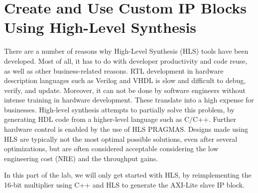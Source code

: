 \documentclass[a4paper,12pt,twoside]{article}
\begin{document}
\section{Create and Use Custom IP Blocks Using High-Level Synthesis}\label{S2}
There are a number of reasons why High-Level Synthesis (HLS) tools have been developed. Most of all, it has to do with developer productivity and code reuse, as well as other business-related reasons. RTL development in hardware description languages such as Verilog and VHDL is slow and difficult to debug, verify, and update. Moreover, it can not be done by software engineers without intense training in hardware development. These translate into a high expense for businesses. High-level synthesis attempts to partially solve this problem, by generating HDL code from a higher-level language such as C/C++. Further hardware control is enabled by the use of HLS PRAGMAS. Designs made using HLS are typically not the most optimal possible solutions, even after several optimizations, but are often considered acceptable considering the low engineering cost (NRE) and the throughput gains.

In this part of the lab, we will only get started with HLS, by reimplementing the 16-bit multiplier using C++ and HLS to generate the AXI-Lite slave IP block.
\end{document}
